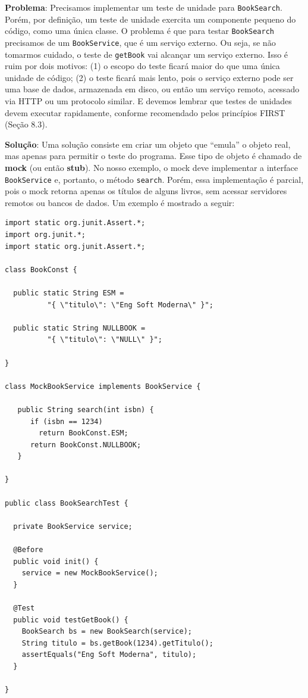 \documentclass[
  11pt,
  twoside]{book}
\newcommand{\passthrough}[1]{#1}
\begin{document}
\textbf{Problema}: Precisamos implementar um teste de unidade para
\passthrough{\lstinline!BookSearch!}. Porém, por definição, um teste de
unidade exercita um componente pequeno do código, como uma única classe.
O problema é que para testar \passthrough{\lstinline!BookSearch!}
precisamos de um \passthrough{\lstinline!BookService!}, que é um serviço
externo. Ou seja, se não tomarmos cuidado, o teste de
\passthrough{\lstinline!getBook!} vai alcançar um serviço externo. Isso
é ruim por dois motivos: (1) o escopo do teste ficará maior do que uma
única unidade de código; (2) o teste ficará mais lento, pois o serviço
externo pode ser uma base de dados, armazenada em disco, ou então um
serviço remoto, acessado via HTTP ou um protocolo similar. E devemos
lembrar que testes de unidades devem executar rapidamente, conforme
recomendado pelos princípios FIRST (Seção 8.3).

\textbf{Solução}: Uma solução consiste em criar um objeto que ``emula''
o objeto real, mas apenas para permitir o teste do programa. Esse tipo
de objeto é chamado de \textbf{mock} (ou então \textbf{stub}). No nosso
exemplo, o mock deve implementar a interface
\passthrough{\lstinline!BookService!} e, portanto, o método
\passthrough{\lstinline!search!}. Porém, essa implementação é parcial,
pois o mock retorna apenas os títulos de alguns livros, sem acessar
servidores remotos ou bancos de dados. Um exemplo é mostrado a seguir:

\begin{lstlisting}
import static org.junit.Assert.*;
import org.junit.*;
import static org.junit.Assert.*;

class BookConst {

  public static String ESM = 
          "{ \"titulo\": \"Eng Soft Moderna\" }";        

  public static String NULLBOOK = 
          "{ \"titulo\": \"NULL\" }";

}

class MockBookService implements BookService {

   public String search(int isbn) {
      if (isbn == 1234)
        return BookConst.ESM;
      return BookConst.NULLBOOK;
   }

}

public class BookSearchTest {

  private BookService service;

  @Before
  public void init() {
    service = new MockBookService();
  }        

  @Test
  public void testGetBook() {
    BookSearch bs = new BookSearch(service);
    String titulo = bs.getBook(1234).getTitulo();
    assertEquals("Eng Soft Moderna", titulo);
  }

}
\end{lstlisting}
\end{document}
